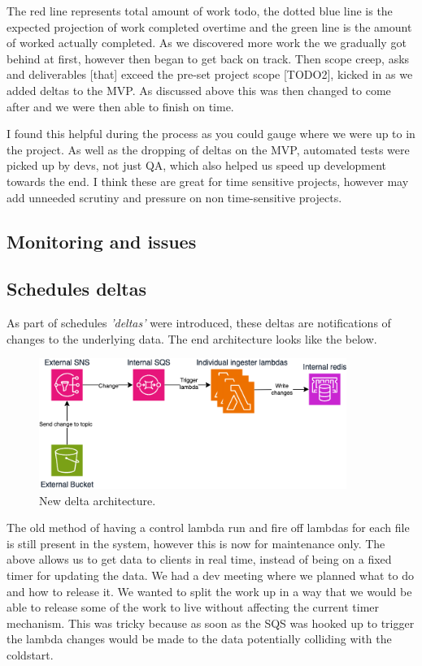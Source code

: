   The red line represents total amount of work todo, the dotted blue line is the expected projection of work completed overtime and the green line 
  is the amount of worked actually completed. As we discovered more work the we gradually got behind at first, however then began to get back 
  on track. Then scope creep, asks and deliverables [that] exceed the pre-set project scope [TODO2], kicked in as we added deltas to the MVP. As discussed 
  above this was then changed to come after and we were then able to finish on time.

  I found this helpful during the process as you could gauge where we were up to in the project. As well as the dropping of deltas on the MVP, automated 
  tests were picked up by devs, not just QA, which also helped us speed up development towards the end. I think these are great for time sensitive
  projects, however may add unneeded scrutiny and pressure on non time-sensitive projects.

  \subsection{Monitoring and issues}

  \subsection{Schedules deltas}
  As part of schedules \textit{'deltas'} were introduced, these deltas are notifications of changes to the underlying data. The end architecture looks
  like the below.

  \begin{figure}[H]
    \centering
    \includegraphics[width=10cm]{assets/scheduleDeltas.drawio.png}
    \caption{New delta architecture.}
    \label{fig:scheduleDeltas}
  \end{figure}

  The old method of having a control lambda run and fire off lambdas for each file is still present in the system, however this is now for maintenance
  only. The above allows us to get data to clients in real time, instead of being on a fixed timer for updating the data. We had a dev meeting where we 
  planned what to do and how to release it. We wanted to split the work up in a way that we would be able to release some of the work to live without
  affecting the current timer mechanism. This was tricky because as soon as the SQS was hooked up to trigger the lambda changes would be made to the data 
  potentially colliding with the coldstart.

